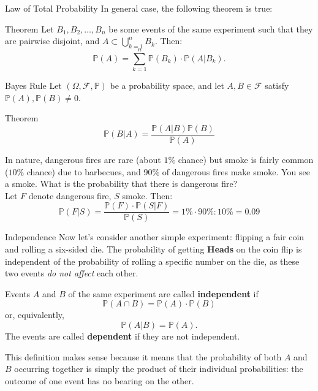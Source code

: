 \documentclass{beamer}
\newcommand{\PP}{\mathbb{P}}
\newcommand{\F}{\mathcal{F}}
\begin{document}
\begin{frame}{Law of Total Probability}
In general case, the following theorem is true:
\begin{block}{Theorem}
 Let \( B_1, B_2, \ldots, B_n \) be some events of the same experiment such that they are pairwise disjoint, and \( A \subset \bigcup_{k=1}^{n} B_k \). Then:
\[ \mathbb{P}(A) = \sum_{k=1}^{n} \mathbb{P}(B_k) \cdot \mathbb{P}(A|B_k). \]


\end{block}
\end{frame}




\begin{frame}{Bayes Rule}
Let \( (\Omega, \F, \PP) \) be a probability space, and let \( A, B \in \F \) satisfy \( \PP(A), \PP(B) \ne 0 \). 

\begin{block}{Theorem}
\[ \PP(B|A) = \frac{\PP(A|B)\PP(B)}{\PP(A)} \]
\end{block}
\pause
\begin{example}
    In nature, dangerous fires are rare (about $1\%$ chance) but smoke is fairly common ($10\%$ chance) due to barbecues, and $90\%$ of dangerous fires make smoke. \pause You see a smoke. What is the probability that there is dangerous fire?\pause
    \\ Let $F$ denote dangerous fire, $S$ smoke. Then:
    \[\PP(F|S) =\frac{\PP(F)\cdot \PP(S|F)}{\PP(S)}=1\% \cdot 90\% : 10\%=	0.09\]
\end{example}

\end{frame}



\begin{frame}{Independence}
Now let's consider another simple experiment: flipping a fair coin and rolling a six-sided die. The probability of getting \textbf{Heads} on the coin flip is independent of the probability of rolling a specific number on the die, as these two events \textit{do not affect} each other.

\pause
\begin{definition}
    Events \(A\) and \(B\) of the same experiment are called \textbf{independent} if
\[
\PP(A \cap B) = \PP(A) \cdot \PP(B)
\]\pause
or, equivalently,
\[\PP(A|B)=\PP(A).\]
\pause The events are called \textbf{dependent} if they are not independent.

\end{definition}
\pause This definition makes sense because it means that the probability of both $A$ and $B$ occurring together is simply the product of their individual probabilities: the outcome of one event has no bearing on the other.
\end{frame}
\end{document}
